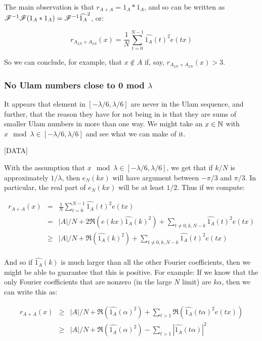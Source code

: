\documentclass{article}
\theoremstyle{definition}
\theoremstyle{remark}
\numberwithin{equation}{section}
\begin{document}
{The main observation is that $r_{A+A} = 1_A \ast 1_A$, and so can be
written as $\mathscr{F}^{-1}\mathscr{F} (1_A \ast 1_A) =
\mathscr{F}^{-1} \widehat{1_A}^2$, or: 

\[r_{A_{2N}+A_{2N}}(x) = \frac 1N \sum_{t=0}^{N-1} \widehat{1_A}(t)^2
e(tx)\]

So we can conclude, for example, that $x \notin A$ if, say,
$r_{A_{2N}+A_{2N}}(x) > 3$.  

\subsubsection{No Ulam numbers close to 0 mod $\lambda$}

It appears that element in $[-\lambda/6,\lambda/6]$ are never in the
Ulam sequence, and further, that the reason they have for not being in
is that they are sums of smaller Ulam numbers in more than one way.
We might take an $x \in \mathbb{N}$ with
$x \mod{\lambda} \in [-\lambda/6,\lambda/6]$ and see what we can make
of it.  

[DATA]

With the assumption that $x \mod{\lambda} \in [-\lambda/6,\lambda/6]$,
we get that if $k/N$ is approximately $1/\lambda$, then $e_N(kx)$ will
have argument between $-\pi/3$ and $\pi/3$.  In particular, the real
part of $e_N(kx)$ will be at least $1/2$.  Thus if we compute: 

\begin{eqnarray*}
r_{A+A}(x) &=& \frac 1N \sum_{t=0}^{N-1} \widehat{1_A}(t)^2 e(tx)\\
 &=& |A|/N + 2\Re(e(kx)\widehat{1_A}(k)^2) + \sum_{t\neq 0,k,N-k}
 \widehat{1_A}(t)^2 e(tx)\\
 &\geq& |A|/N + \Re(\widehat{1_A}(k)^2) + \sum_{t\neq 0,k,N-k}
 \widehat{1_A}(t)^2 e(tx)\\
\end{eqnarray*}

And so if $\widehat{1_A}(k)$ is much larger than all the other Fourier
coefficients, then we might be able to guarantee that this is
positive.  For example: If we know that the only Fourier coefficients
that are nonzero (in the large $N$ limit) are $k\alpha$, then we can
write this as: 

\begin{eqnarray*}
r_{A+A}(x) &\geq& |A|/N + \Re(\widehat{1_A}(\alpha)^2) + \sum_{t > 1}
 \Re(\widehat{1_A}(t \alpha)^2 e(tx))\\
 &\geq& |A|/N + \Re(\widehat{1_A}(\alpha)^2) - \sum_{t > 1}
 |\widehat{1_A}(t \alpha)|^2\\
\end{eqnarray*}

}
\end{document}
